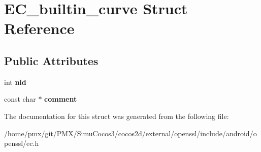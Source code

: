\hypertarget{structEC__builtin__curve}{}\section{E\+C\+\_\+builtin\+\_\+curve Struct Reference}
\label{structEC__builtin__curve}
\subsection*{Public Attributes}
\begin{DoxyCompactItemize}
\item 
\mbox{\label{structEC__builtin__curve_a31dc38a7d4ada38cd9249b87fb5d8f20}} 
int {\bfseries nid}
\item 
\mbox{\label{structEC__builtin__curve_a0a8e008628c551ea3ed4b0d3eb3d8d4e}} 
const char $\ast$ {\bfseries comment}
\end{DoxyCompactItemize}


The documentation for this struct was generated from the following file\+:\begin{DoxyCompactItemize}
\item 
/home/pmx/git/\+P\+M\+X/\+Simu\+Cocos3/cocos2d/external/openssl/include/android/openssl/ec.\+h\end{DoxyCompactItemize}
